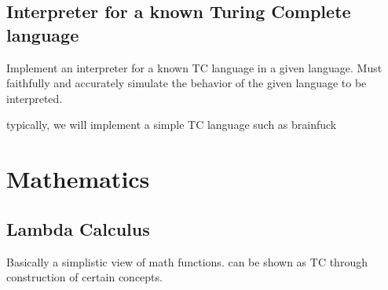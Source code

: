 \subsection{Interpreter for a known Turing Complete language}\label{subsec:InterpreterTC}

Implement an interpreter for a known TC language in a given language.
Must faithfully and accurately simulate the behavior of the given language to be interpreted.

typically, we will implement a simple TC language such as brainfuck

\section{Mathematics}\label{sec:Maths}

\subsection{Lambda Calculus}\label{subsec:LambdaCalc}

Basically a simplistic view of math functions.
can be shown as TC through construction of certain concepts.